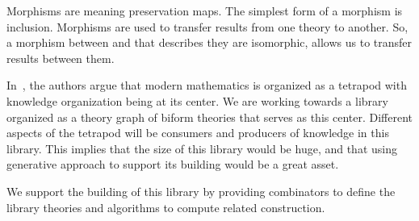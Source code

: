Morphisms are meaning preservation maps. The simplest form of a morphism is inclusion. Morphisms are used to transfer results from one theory to another. So, a morphism between  and  that describes they are isomorphic, allows us to transfer results between them. 

In~\cite{carette2020bigMath}, the authors argue that modern mathematics is organized as a tetrapod with knowledge organization being at its center. We are working towards a library organized as a theory graph of biform theories that serves as this center. Different aspects of the tetrapod will be consumers and producers of knowledge in this library. This implies that the size of this library would be huge, and that using generative approach to support its building would be a great asset. 

We support the building of this library by providing combinators to define the library theories and algorithms to compute related construction.







